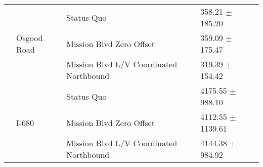 \begin{table}
\begin{tabular}{llll}
 & \multirow[t]{3}{*}{Osgood Road} & Status Quo & 358.21 $\pm$ 185.20 \\
 &  & Mission Blvd Zero Offset & 359.09 $\pm$ 175.47 \\
 &  & Mission Blvd L/V Coordinated Northbound & 319.39 $\pm$ 154.42 \\
 & \multirow[t]{3}{*}{I-680} & Status Quo & 4175.55 $\pm$ 988.10 \\
 &  & Mission Blvd Zero Offset & 4112.55 $\pm$ 1139.61 \\
 &  & Mission Blvd L/V Coordinated Northbound & 4144.38 $\pm$ 984.92 \\
\bottomrule
\end{tabular}
\end{table}
